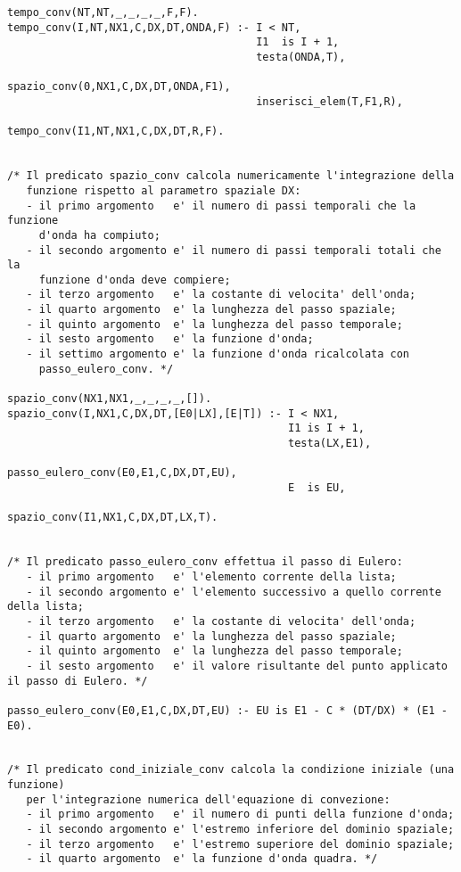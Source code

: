 \begin{verbatim}
tempo_conv(NT,NT,_,_,_,_,F,F).
tempo_conv(I,NT,NX1,C,DX,DT,ONDA,F) :- I < NT,
                                       I1  is I + 1,
                                       testa(ONDA,T),                
                                       spazio_conv(0,NX1,C,DX,DT,ONDA,F1), 
                                       inserisci_elem(T,F1,R),                
                                       tempo_conv(I1,NT,NX1,C,DX,DT,R,F). 


/* Il predicato spazio_conv calcola numericamente l'integrazione della
   funzione rispetto al parametro spaziale DX:
   - il primo argomento   e' il numero di passi temporali che la funzione
     d'onda ha compiuto;
   - il secondo argomento e' il numero di passi temporali totali che la
     funzione d'onda deve compiere; 
   - il terzo argomento   e' la costante di velocita' dell'onda;      
   - il quarto argomento  e' la lunghezza del passo spaziale;
   - il quinto argomento  e' la lunghezza del passo temporale;
   - il sesto argomento   e' la funzione d'onda;
   - il settimo argomento e' la funzione d'onda ricalcolata con 
     passo_eulero_conv. */

spazio_conv(NX1,NX1,_,_,_,_,[]).
spazio_conv(I,NX1,C,DX,DT,[E0|LX],[E|T]) :- I < NX1,
                                            I1 is I + 1,
                                            testa(LX,E1),
                                            passo_eulero_conv(E0,E1,C,DX,DT,EU),
                                            E  is EU,
                                            spazio_conv(I1,NX1,C,DX,DT,LX,T).


/* Il predicato passo_eulero_conv effettua il passo di Eulero:
   - il primo argomento   e' l'elemento corrente della lista;
   - il secondo argomento e' l'elemento successivo a quello corrente della lista;
   - il terzo argomento   e' la costante di velocita' dell'onda;
   - il quarto argomento  e' la lunghezza del passo spaziale;
   - il quinto argomento  e' la lunghezza del passo temporale;
   - il sesto argomento   e' il valore risultante del punto applicato il passo di Eulero. */

passo_eulero_conv(E0,E1,C,DX,DT,EU) :- EU is E1 - C * (DT/DX) * (E1 - E0).


/* Il predicato cond_iniziale_conv calcola la condizione iniziale (una funzione)
   per l'integrazione numerica dell'equazione di convezione:
   - il primo argomento   e' il numero di punti della funzione d'onda;
   - il secondo argomento e' l'estremo inferiore del dominio spaziale;
   - il terzo argomento   e' l'estremo superiore del dominio spaziale; 
   - il quarto argomento  e' la funzione d'onda quadra. */


\end{verbatim}
